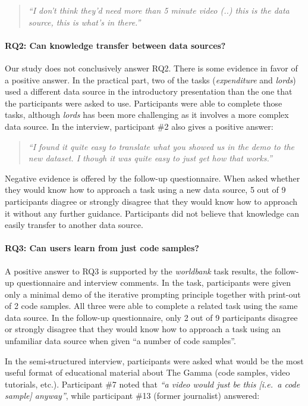 \documentclass{sigchi}
\begin{document}
\begin{quote}
\emph{``I don't think they'd need more than 5 minute video (..) this is the data
  source, this is what's in there.''}
\end{quote}

\paragraph{RQ2: Can knowledge transfer between data sources?}
Our study does not conclusively answer RQ2. There is some evidence in favor of a positive answer.
In the practical part, two of the tasks (\emph{expenditure} and \emph{lords}) used a different data
source in the introductory presentation than the one that the participants were asked to use.
Participants were able to complete those tasks, although \emph{lords} has been more challenging
as it involves a more complex data source. In the interview, participant \#2 also gives a positive
answer:

\begin{quote}
\emph{``I found it quite easy to translate what you showed us in the demo to the new dataset.
   I though it was quite easy to just get how that works.''}
\end{quote}

Negative evidence is offered by the follow-up questionnaire. When asked
whether they would know how to approach a task using a new data source, 5 out of 9 participants
diagree or strongly disagree that they would know how to approach it without any further guidance.
Participants did not believe that knowledge can easily transfer to another
data source.

\paragraph{RQ3: Can users learn from just code samples?}
A positive answer to RQ3 is supported by the \emph{worldbank} task results, the follow-up questionnaire
and interview comments. In the task, participants were given only a
minimal demo of the iterative prompting principle together with print-out of 2 code samples.
All three were able to complete a related task using the same data source. In the follow-up
questionnaire, only 2 out of 9 participants disagree or strongly disagree that
they would know how to approach a task using an unfamiliar data source when given ``a number
of code samples''.

In the semi-structured interview, participants were asked what would be the most useful format
of educational material about The Gamma (code samples, video tutorials, etc.).
Participant \#7 noted that \emph{``a video would just be this [i.e.~a code sample] anyway''}, while
participant \#13 (former journalist) answered:
\end{document}
